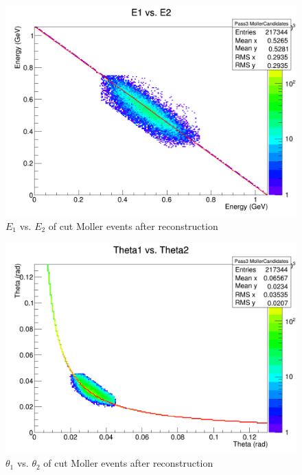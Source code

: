 \documentclass{article}
\begin{document}
	\begin{figure}[H]
  	\includegraphics[width=\linewidth]{PostCollabMeet/Pass3Data/Full5772/CUT_PlotEE.png}
  	\caption{$E_1$ vs. $E_2$ of cut Moller events after reconstruction}
  	\label{fig:cutDataEE}
	\end{figure}
	
	\begin{figure}[H]
  	\includegraphics[width=\linewidth]{PostCollabMeet/Pass3Data/Full5772/CUT_PlotTT.png}
  	\caption{$\theta_1$ vs. $\theta_2$ of cut Moller events after reconstruction}
  	\label{fig:cutDataTT}
	\end{figure}
	
\end{document}
